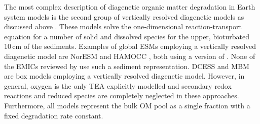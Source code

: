 \documentclass[gmd, manuscript]{copernicus}
\begin{document}
The most complex description of diagenetic organic matter degradation in Earth system models is the second group of vertically resolved diagenetic models as discussed above 
\citep[e.g.][]{heinze_global_1999, munhoven_glacialinterglacial_2007, shaffer_presentation_2008}. 
These models solve the one-dimensional reaction-transport equation for a number of solid and dissolved species for the upper, bioturbated 10\,cm of the sediments. 
Examples of global ESMs employing a vertically resolved diagenetic model are NorESM \citep{tjiputra_evaluation_2013} and HAMOCC \citep{palastanga_long_term_2011, ilyina_global_2013}, 
both using a version of \citet{heinze_global_1999}. None of the EMICs reviewed by \citet{hulse_understanding_2017} use such a sediment representation. 
DCESS \citep{shaffer_presentation_2008} and MBM \citep{munhoven_glacialinterglacial_2007} are box models employing a vertically resolved diagenetic model. 
However, in general, oxygen is the only TEA explicitly modelled and secondary redox reactions and reduced species are completely neglected in these approaches. 
Furthermore, all models represent the bulk OM pool as a single fraction with a fixed degradation rate constant. 

\end{document}
